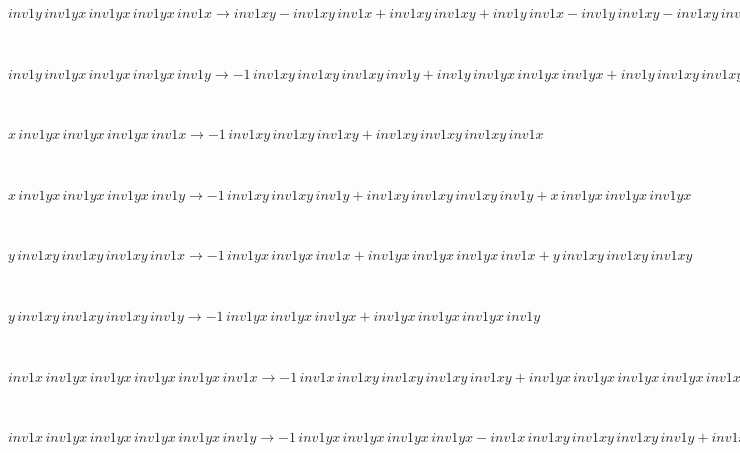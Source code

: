 \documentclass[rep10,leqno]{report}
\begin{document}
\begin{minipage}{6in}
$
inv1y\,
 inv1yx\,
 inv1yx\,
 inv1yx\,
 inv1x\rightarrow inv1xy - inv1xy\,
 inv1x + inv1xy\,
 inv1xy + inv1y\,
 inv1x - inv1y\,
 inv1xy - inv1xy\,
 inv1xy\,
 inv1x + inv1xy\,
 inv1xy\,
 inv1xy + inv1y\,
 inv1xy\,
 inv1x - inv1y\,
 inv1xy\,
 inv1xy - inv1xy\,
 inv1xy\,
 inv1xy\,
 inv1x + inv1y\,
 inv1xy\,
 inv1xy\,
 inv1x - inv1y\,
 inv1xy\,
 inv1xy\,
 inv1xy + inv1y\,
 inv1xy\,
 inv1xy\,
 inv1xy\,
 inv1x
$
\end{minipage}\medskip \\
\begin{minipage}{6in}
$
inv1y\,
 inv1yx\,
 inv1yx\,
 inv1yx\,
 inv1y\rightarrow -1\,
 inv1xy\,
 inv1xy\,
 inv1xy\,
 inv1y + inv1y\,
 inv1yx\,
 inv1yx\,
 inv1yx + inv1y\,
 inv1xy\,
 inv1xy\,
 inv1xy\,
 inv1y
$
\end{minipage}\medskip \\
\begin{minipage}{6in}
$
x\,
 inv1yx\,
 inv1yx\,
 inv1yx\,
 inv1x\rightarrow -1\,
 inv1xy\,
 inv1xy\,
 inv1xy + inv1xy\,
 inv1xy\,
 inv1xy\,
 inv1x
$
\end{minipage}\medskip \\
\begin{minipage}{6in}
$
x\,
 inv1yx\,
 inv1yx\,
 inv1yx\,
 inv1y\rightarrow -1\,
 inv1xy\,
 inv1xy\,
 inv1y + inv1xy\,
 inv1xy\,
 inv1xy\,
 inv1y + x\,
 inv1yx\,
 inv1yx\,
 inv1yx
$
\end{minipage}\medskip \\
\begin{minipage}{6in}
$
y\,
 inv1xy\,
 inv1xy\,
 inv1xy\,
 inv1x\rightarrow -1\,
 inv1yx\,
 inv1yx\,
 inv1x + inv1yx\,
 inv1yx\,
 inv1yx\,
 inv1x + y\,
 inv1xy\,
 inv1xy\,
 inv1xy
$
\end{minipage}\medskip \\
\begin{minipage}{6in}
$
y\,
 inv1xy\,
 inv1xy\,
 inv1xy\,
 inv1y\rightarrow -1\,
 inv1yx\,
 inv1yx\,
 inv1yx + inv1yx\,
 inv1yx\,
 inv1yx\,
 inv1y
$
\end{minipage}\medskip \\
\begin{minipage}{6in}
$
inv1x\,
 inv1yx\,
 inv1yx\,
 inv1yx\,
 inv1yx\,
 inv1x\rightarrow -1\,
 inv1x\,
 inv1xy\,
 inv1xy\,
 inv1xy\,
 inv1xy + inv1yx\,
 inv1yx\,
 inv1yx\,
 inv1yx\,
 inv1x + inv1x\,
 inv1xy\,
 inv1xy\,
 inv1xy\,
 inv1xy\,
 inv1x
$
\end{minipage}\medskip \\
\begin{minipage}{6in}
$
inv1x\,
 inv1yx\,
 inv1yx\,
 inv1yx\,
 inv1yx\,
 inv1y\rightarrow -1\,
 inv1yx\,
 inv1yx\,
 inv1yx\,
 inv1yx - inv1x\,
 inv1xy\,
 inv1xy\,
 inv1xy\,
 inv1y + inv1x\,
 inv1yx\,
 inv1yx\,
 inv1yx\,
 inv1yx + inv1yx\,
 inv1yx\,
 inv1yx\,
 inv1yx\,
 inv1y + inv1x\,
 inv1xy\,
 inv1xy\,
 inv1xy\,
 inv1xy\,
 inv1y
$
\end{minipage}\medskip \\
\end{document}
